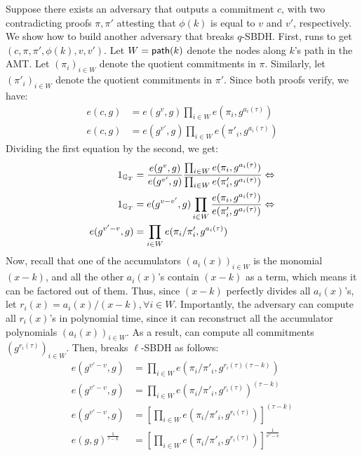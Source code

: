 Suppose there exists an adversary \Adv that outputs a commitment $c$, with two contradicting proofs $\pi, \pi'$ attesting that $\phi(k)$ is equal to $v$ and $v'$, respectively.
We show how to build another adversary \AdvB that breaks $q$-SBDH.
First, \AdvB runs \Adv to get $(c, \pi, \pi', \phi(k), v, v')$.
Let $W=\mathsf{path}(k)$ denote the nodes along $k$'s path in the AMT.
Let $(\pi_i)_{i\in W}$ denote the quotient commitments in $\pi$.
Similarly, let $(\pi'_i)_{i\in W}$ denote the quotient commitments in $\pi'$.
Since both proofs verify, we have:
\begin{align*}
e(c, g) &= e(g^{v}, g) \prod_{i\in W} {e(\pi_i, g^{a_i(\tau)})}\\
e(c, g) &= e(g^{v'}, g) \prod_{i \in W} {e(\pi'_i, g^{a_i(\tau)})}
\end{align*}
Dividing the first equation by the second, we get:
\begin{align*}
1_{\mathbb{G}_T} &= \frac{e(g^{v}, g)}{e(g^{v'}, g)} \frac{\prod_{i \in W} {e(\pi_i, g^{a_i(\tau)})}} {\prod_{i \in W} {e(\pi'_i, g^{a_i(\tau)})}}\Leftrightarrow\\
1_{\mathbb{G}_T} &= {e(g^{v-v'}, g)} \prod_{i \in W} \frac{e(\pi_i, g^{a_i(\tau)})}{e(\pi'_i, g^{a_i(\tau)})} \Leftrightarrow\\
e(g^{v'-v}, g) &= \prod_{i \in W} e(\pi_i / \pi'_i, g^{a_i(\tau)})
\end{align*}
Now, recall that one of the accumulators $(a_i(x))_{i\in W}$ is the monomial $(x - k)$, and all the other $a_i(x)$'s contain $(x-k)$ as a term, which means it can be factored out of them.
Thus, since $(x-k)$ perfectly divides all $a_i(x)$'s, let $r_i(x) = a_i(x) / (x-k), \forall i\in W$.
Importantly, the adversary \AdvB can compute all $r_i(x)$'s in polynomial time, since it can reconstruct all the accumulator polynomials $(a_i(x))_{i\in W}$.
As a result, \AdvB can compute all commitments $(g^{r_i(\tau)})_{i \in W}$.
Then, \AdvB breaks $\ell$-SBDH as follows:
\begin{align*}
e(g^{v'-v}, g) &= \prod_{i\in W} {e(\pi_i / \pi'_i, g^{r_i(\tau)(\tau-k)})}\\
e(g^{v'-v}, g) &= \prod_{i\in W} {e(\pi_i / \pi'_i, g^{r_i(\tau)})^{(\tau-k)}}\\
e(g^{v'-v}, g) &= \left[\prod_{i\in W} {e(\pi_i / \pi'_i, g^{r_i(\tau)})}\right]^{(\tau-k)}\\
e(g, g)^{\frac{1}{\tau-k}} &= \left[\prod_{i\in W} {e(\pi_i / \pi'_i, g^{r_i(\tau)})}\right]^{\frac{1}{v'-v}}
\end{align*}
